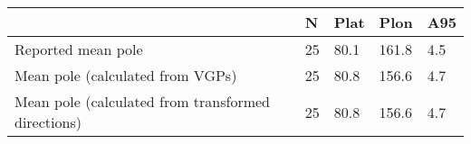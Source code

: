 \begin{tabular}{lllll}
\toprule
{} &   N &  Plat &   Plon &  A95 \\
\midrule
Reported mean pole                                 &  25 &  80.1 &  161.8 &  4.5 \\
Mean pole (calculated from VGPs)                   &  25 &  80.8 &  156.6 &  4.7 \\
Mean pole (calculated from transformed directions) &  25 &  80.8 &  156.6 &  4.7 \\
\bottomrule
\end{tabular}
